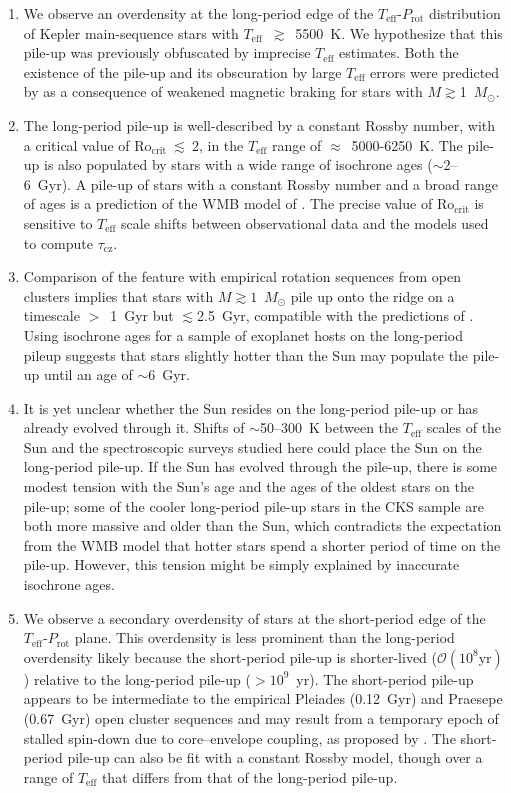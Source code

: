 \documentclass[linenumbers,tighten,trackchanges,twocolumn]{aastex631}
\newcommand{\taucz}{$\tau_\mathrm{cz}$\xspace}
\newcommand{\rocrit}{$\mathrm{Ro_{crit}}$\xspace}
\newcommand{\rocritfinal}{$\mathrm{Ro_{crit}}~\lesssim~2$\xspace}
\newcommand{\teffmin}{5500~K\xspace}
\newcommand{\agerange}{$\sim$2--6~Gyr\xspace}
\newcommand{\teff}{\ensuremath{T_{\mathrm{eff}}}\xspace}
\newcommand{\msun}{$M_\odot$\xspace}
\newcommand{\prot}{\ensuremath{P_\mathrm{rot}}\xspace}
\begin{document}
\begin{enumerate}
    \item We observe an overdensity at the long-period edge of the \teff-\prot distribution of Kepler main-sequence stars with \teff~$\gtrsim$~\teffmin. We hypothesize that this pile-up was previously obfuscated by imprecise \teff estimates. Both the existence of the pile-up and its obscuration by large \teff errors were predicted by \citet{vanSaders2019} as a consequence of weakened magnetic braking for stars with $M\gtrsim$1~\msun. 
    
    \item The long-period pile-up is well-described by a constant Rossby number, with a critical value of \rocritfinal, in the \teff range of $\approx$~5000-6250~K. The pile-up is also populated by stars with a wide range of isochrone ages (\agerange). A pile-up of stars with a constant Rossby number and a broad range of ages is a prediction of the WMB model of \citet{vanSaders2016, vanSaders2019}. The precise value of \rocrit is sensitive to \teff scale shifts between observational data and the models used to compute \taucz. 

    \item Comparison of the feature with empirical rotation sequences from open clusters implies that stars with $M\gtrsim1$~\msun pile up onto the ridge on a timescale $>$~1~Gyr but $\lesssim$2.5~Gyr, compatible with the predictions of \citet{vanSaders2019}. Using isochrone ages for a sample of exoplanet hosts on the long-period pileup suggests that stars slightly hotter than the Sun may populate the pile-up until an age of $\sim$6~Gyr.
    
    \item It is yet unclear whether the Sun resides on the long-period pile-up or has already evolved through it. Shifts of $\sim$50--300~K between the \teff scales of the Sun and the spectroscopic surveys studied here could place the Sun on the long-period pile-up. If the Sun has evolved through the pile-up, there is some modest tension with the Sun's age and the ages of the oldest stars on the pile-up; some of the cooler long-period pile-up stars in the CKS sample are both more massive and older than the Sun, which contradicts the expectation from the WMB model that hotter stars spend a shorter period of time on the pile-up. However, this tension might be simply explained by inaccurate isochrone ages.
    
    \item We observe a secondary overdensity of stars at the short-period edge of the \teff-\prot plane. This overdensity is less prominent than the long-period overdensity likely because the short-period pile-up is shorter-lived ($\mathcal{O}(10^8 \text{yr})$) relative to the long-period pile-up ($>10^9$~yr). The short-period pile-up appears to be intermediate to the empirical Pleiades (0.12~Gyr) and Praesepe (0.67~Gyr) open cluster sequences and may result from a temporary epoch of stalled spin-down due to core–envelope coupling, as proposed by \citet{Curtis2020}. The short-period pile-up can also be fit with a constant Rossby model, though over a range of \teff that differs from that of the long-period pile-up.
    

\end{enumerate}
\end{document}
